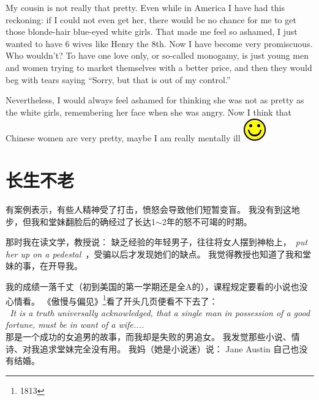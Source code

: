 \documentclass[12pt]{report}
\newcommand{\cc}[2]{#1}
\newcommand{\cc}[2]{#2}
\newcommand{\speechEn}[1]{\textrm{\textit{\ #1\ }}}
\newcommand*\smiley{\includegraphics[scale=0.5]{smiley.jpg}}
\begin{document}
{My cousin is not really that pretty.  Even while in America I have had this reckoning:  if I could not even get her, there would be no chance for me to get those blonde-hair blue-eyed white girls.  That made me feel so ashamed, I just wanted to have 6 wives like Henry the 8th.  Now I have become very promiscuous.  Who wouldn't?  To have one love only, or so-called monogamy, is just young men and women trying to market themselves with a better price, and then they would beg with tears saying ``Sorry, but that is out of my control.''

Nevertheless, I would always feel ashamed for thinking she was not as pretty as the white girls, remembering her face when she was angry.  Now I think that Chinese women are very pretty, maybe I am really mentally ill \smiley
}

\chapter{\cc{长生不老}{Immortality}}

\cc{
有案例表示，有些人精神受了打击，愤怒会导致他们短暂变盲。 我没有到这地步，但我和堂妹翻脸后的确经过了长达1$\sim$2年的怒不可竭的时期。}{
There exist clinical records of people who turned temporarily blind after suffering traumas.  Though I have not reached that stage, I went through 1$\sim$2 years of rage after the quarrel with cousin. }

\cc{
那时我在读文学，教授说： 缺乏经验的年轻男子，往往将女人摆到神枱上，\speechEn{put her up on a pedestal}，受骗以后才发现她们的缺点。  我觉得教授也知道了我和堂妹的事，在开导我。}{
At that time, I was studying literature, and the professor said that young men who are inexperienced with women often ``put them on a pedestal'', until they realize they have been fooled.  I thought the professor knew about my affair with cousin, and that he was trying to advice me.
}

\cc{
我的成绩一落千丈（初到美国的第一学期还是全A的），课程规定要看的小说也没心情看。 《傲慢与偏见》\footnote{1813}看了开头几页便看不下去了： \\
}{
	
}
\speechEn{It is a truth universally acknowledged, that a single man in possession of a good fortune, must be in want of a wife....} \\
\cc{
那是一个成功的女追男的故事，而我却是失败的男追女。 我发觉那些小说、情诗、对我追求堂妹完全没有用。 我妈（她是小说迷）说： Jane Austin 自己也没有结婚。
}{
	
}
\end{document}
